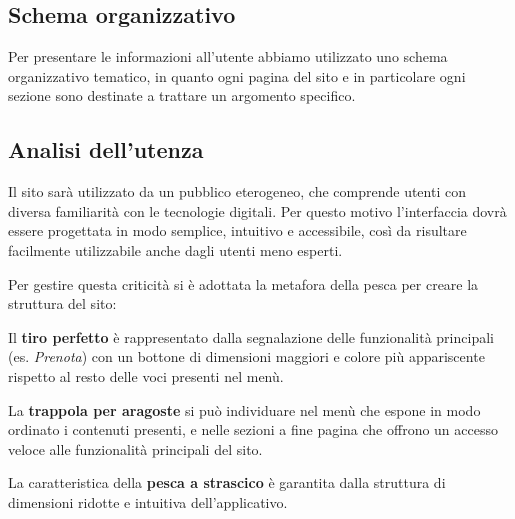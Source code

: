 \documentclass{article}
\begin{document}
\subsection{Schema organizzativo}

Per presentare le informazioni all'utente abbiamo utilizzato uno schema organizzativo tematico,
in quanto ogni pagina del sito e in particolare ogni sezione sono destinate a trattare un argomento specifico.

\subsection{Analisi dell'utenza}
Il sito sarà utilizzato da un pubblico eterogeneo, che comprende utenti con diversa familiarità con le tecnologie digitali. Per questo motivo l’interfaccia dovrà essere progettata in modo semplice, intuitivo e accessibile, così da risultare facilmente utilizzabile anche dagli utenti meno esperti.

Per gestire questa criticità si è adottata la metafora della pesca per creare la struttura del sito: 

Il \textbf{tiro perfetto} è rappresentato dalla segnalazione delle funzionalità principali (es. \textit{Prenota}) con un bottone di dimensioni maggiori e colore più appariscente rispetto al resto delle voci presenti nel menù.

La \textbf{trappola per aragoste} si può individuare nel menù che espone in modo ordinato i contenuti presenti, e nelle sezioni a fine pagina che offrono un accesso veloce alle funzionalità principali del sito.

La caratteristica della \textbf{pesca a strascico} è garantita dalla struttura di dimensioni ridotte e intuitiva dell'applicativo.
\end{document}
